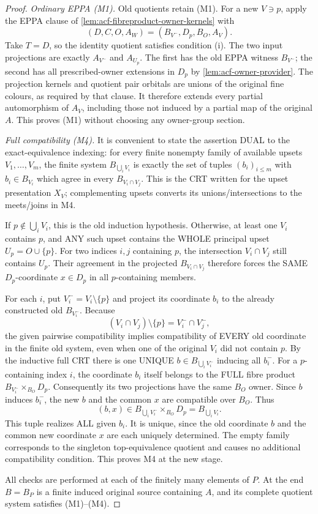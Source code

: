\begin{proof}
\emph{Ordinary EPPA (M1).}
Old quotients retain (M1). For a new $V\ni p$, apply the EPPA
clause of \cref{lem:acf-fibreproduct-owner-kernels} with
\[
 (D,C,O,A_W)=(B_{V^-},D_p,B_O,A_V).
\]
Take $T=D$, so the identity quotient satisfies condition (i).
The two input projections are exactly $A_{V^-}$ and $A_{U_p}$.
The first has the old EPPA witness $B_{V^-}$; the second has
all prescribed-owner extensions in $D_p$ by
\cref{lem:acf-owner-provider}. The projection kernels and
quotient pair orbitals are unions of the original fine colours,
as required by that clause. It therefore extends every partial
automorphism of $A_V$, including those not induced by a partial
map of the original $A$. This proves (M1) without choosing any
owner-group section.

\emph{Full compatibility (M4).}
It is convenient to state the
assertion DUAL to the exact-equivalence
indexing: for every finite nonempty
family of available upsets
\(V_1,\ldots,V_m\), the finite system
\(B_{\bigcup_i V_i}\) is exactly the
set of tuples \((b_i)_{i\le m}\)
with \(b_i\in B_{V_i}\) which agree
in every \(B_{V_i\cap V_j}\).
This is the CRT written for the
upset presentation \(X_V\);
complementing upsets converts its
unions/intersections to the
meets/joins in M4.

If \(p\notin \bigcup_iV_i\), this
is the old induction hypothesis.
Otherwise, at least one \(V_i\)
contains \(p\), and ANY such
upset contains the WHOLE principal
upset \(U_p=O\cup\{p\}\).
For two indices \(i,j\) containing
\(p\), the intersection \(V_i\cap
V_j\) still contains \(U_p\).
Their agreement in the projected
\(B_{V_i\cap V_j}\) therefore forces
the SAME \(D_p\)-coordinate
\(x\in D_p\) in all \(p\)-containing
members.

For each \(i\), put \(V_i^-=V_i
\setminus\{p\}\) and project its
coordinate \(b_i\) to the already
constructed old \(B_{V_i^-}\).
Because
\[
 (V_i\cap V_j)\setminus\{p\}
    =V_i^-\cap V_j^- ,
\]
the given pairwise compatibility
implies compatibility of EVERY
old coordinate in the finite old
system, even when one of the
original \(V_i\) did not contain
\(p\). By the inductive full
CRT there is one UNIQUE
\(b\in B_{\bigcup_i V_i^-}\)
inducing all \(b_i^-\).
For a \(p\)-containing index
\(i\), the coordinate \(b_i\)
itself belongs to the FULL
fibre product
\(B_{V_i^-}\times_{B_O}D_p\).
Consequently its two projections
have the same \(B_O\) owner.
Since \(b\) induces \(b_i^-\),
the new \(b\) and the common
\(x\) are compatible over \(B_O\).
Thus
\[
          (b,x)\in
          B_{\bigcup_iV_i^-}
                    \times_{B_O}D_p
          =B_{\bigcup_iV_i}.
\]
This tuple realizes ALL given
\(b_i\). It is unique, since
the old coordinate \(b\) and
the common new coordinate \(x\)
are each uniquely determined.
The empty family corresponds
to the singleton top-equivalence
quotient and causes no additional
compatibility condition.
This proves M4 at the new stage.

All checks are performed at each
of the finitely many elements of
\(P\).  At the end \(B=B_P\)
is a finite induced original source
containing \(A\), and its complete
quotient system satisfies
(M1)--(M4).
\end{proof}

